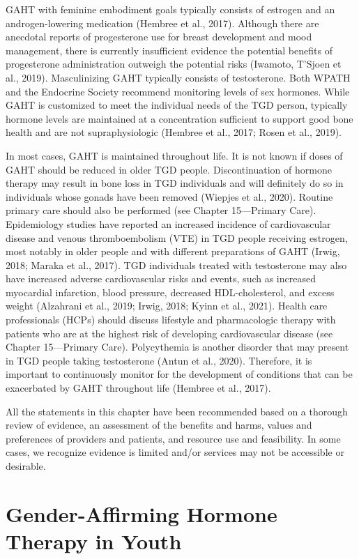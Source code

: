 \documentclass[
]{book}
\begin{document}
GAHT with feminine embodiment goals typically consists of estrogen and an androgen-lowering
medication (Hembree et al., 2017). Although
there are anecdotal reports of progesterone use
for breast development and mood management,
there is currently insufficient evidence the potential benefits of progesterone administration outweigh the potential risks (Iwamoto, T'Sjoen et al.,
2019). Masculinizing GAHT typically consists of
testosterone. Both WPATH and the Endocrine
Society recommend monitoring levels of sex
hormones. While GAHT is customized to meet
the individual needs of the TGD person, typically
hormone levels are maintained at a concentration
sufficient to support good bone health and are
not supraphysiologic (Hembree et al., 2017; Rosen
et al., 2019).

In most cases, GAHT is maintained throughout
life. It is not known if doses of GAHT should be
reduced in older TGD people. Discontinuation of
hormone therapy may result in bone loss in TGD
individuals and will definitely do so in individuals
whose gonads have been removed (Wiepjes et al.,
2020). Routine primary care should also be performed (see Chapter 15---Primary Care).
Epidemiology studies have reported an increased
incidence of cardiovascular disease and venous
thromboembolism (VTE) in TGD people receiving
estrogen, most notably in older people and with
different preparations of GAHT (Irwig, 2018;
Maraka et al., 2017). TGD individuals treated with
testosterone may also have increased adverse cardiovascular risks and events, such as increased
myocardial infarction, blood pressure, decreased
HDL-cholesterol, and excess weight (Alzahrani
et al., 2019; Irwig, 2018; Kyinn et al., 2021). Health
care professionals (HCPs) should discuss lifestyle
and pharmacologic therapy with patients who are
at the highest risk of developing cardiovascular
disease (see Chapter 15---Primary Care).
Polycythemia is another disorder that may present
in TGD people taking testosterone (Antun et al.,
2020). Therefore, it is important to continuously
monitor for the development of conditions that
can be exacerbated by GAHT throughout life
(Hembree et al., 2017).

All the statements in this chapter have been
recommended based on a thorough review of
evidence, an assessment of the benefits and
harms, values and preferences of providers and
patients, and resource use and feasibility. In some
cases, we recognize evidence is limited and/or
services may not be accessible or desirable.

\hypertarget{gender-affirming-hormone-therapy-in-youth}{%
\section*{Gender-Affirming Hormone Therapy in Youth}\label{gender-affirming-hormone-therapy-in-youth}}
\end{document}
